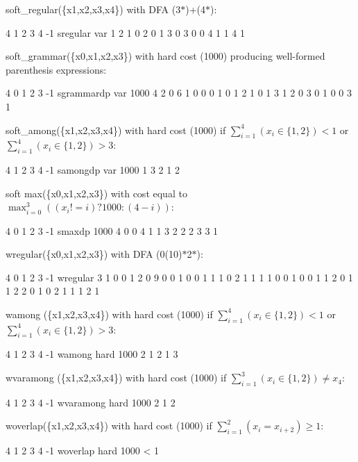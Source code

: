 \documentclass{article}
\begin{document}
\begin{DoxyItemize}
\item soft\-\_\-regular(\{x1,x2,x3,x4\}) with D\-F\-A (3$\ast$)+(4$\ast$)\-:
\begin{DoxyCode}
4 1 2 3 4 -1 sregular var 1 2 1 0 2 0 1 3 0 3 0 0 4 1 1 4 1 
\end{DoxyCode}

\item soft\-\_\-grammar(\{x0,x1,x2,x3\}) with hard cost (1000) producing well-\/formed parenthesis expressions\-:
\begin{DoxyCode}
4 0 1 2 3 -1 sgrammardp var 1000 4 2 0 6 1 0 0 0 1 0 1 2 1 0 1 3 1 2 0 3 0 1 0 0 3 1 
\end{DoxyCode}

\item soft\-\_\-among(\{x1,x2,x3,x4\}) with hard cost (1000) if $\sum_{i=1}^4(x_i \in \{1,2\}) < 1$ or $\sum_{i=1}^4(x_i \in \{1,2\}) > 3$\-:
\begin{DoxyCode}
4 1 2 3 4 -1 samongdp var 1000 1 3 2 1 2 
\end{DoxyCode}

\item soft max(\{x0,x1,x2,x3\}) with cost equal to $\max_{i=0}^3((x_i!=i)?1000:(4-i))$\-:
\begin{DoxyCode}
4 0 1 2 3 -1 smaxdp 1000 4 0 0 4 1 1 3 2 2 2 3 3 1 
\end{DoxyCode}

\item wregular(\{x0,x1,x2,x3\}) with D\-F\-A (0(10)$\ast$2$\ast$)\-:
\begin{DoxyCode}
4 0 1 2 3 -1 wregular 3 1 0 0 1 2 0 9 0 0 1 0 0 1 1 1 0 2 1 1 1 1 0 0 1 0 0 1 1 2 0 1 1 2 2 0 1 0 2 1 1 1 2
       1 
\end{DoxyCode}

\item wamong (\{x1,x2,x3,x4\}) with hard cost (1000) if $\sum_{i=1}^4(x_i \in \{1,2\}) < 1$ or $\sum_{i=1}^4(x_i \in \{1,2\}) > 3$\-:
\begin{DoxyCode}
4 1 2 3 4 -1 wamong hard 1000 2 1 2 1 3 
\end{DoxyCode}

\item wvaramong (\{x1,x2,x3,x4\}) with hard cost (1000) if $\sum_{i=1}^3(x_i \in \{1,2\}) \neq x_4$\-:
\begin{DoxyCode}
4 1 2 3 4 -1 wvaramong hard 1000 2 1 2 
\end{DoxyCode}

\item woverlap(\{x1,x2,x3,x4\}) with hard cost (1000) if $\sum_{i=1}^2(x_i = x_{i+2}) \geq 1$\-:
\begin{DoxyCode}
4 1 2 3 4 -1 woverlap hard 1000 < 1
\end{DoxyCode}


\end{DoxyItemize}
\end{document}
